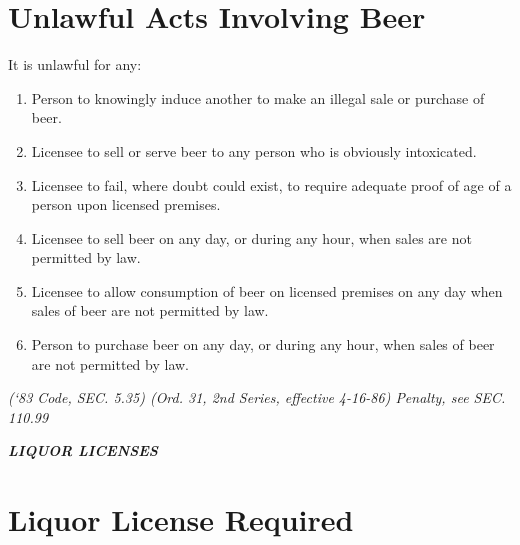 \section{Unlawful Acts Involving Beer}
It is unlawful for any:
\begin{enumerate}[{\indent}A)]
    \item Person to knowingly induce another to make an illegal sale or purchase of beer.
    \item Licensee to sell or serve beer to any person who is obviously intoxicated.
    \item Licensee to fail, where doubt could exist, to require adequate proof of age of a person upon licensed premises.
    \item Licensee to sell beer on any day, or during any hour, when sales are not permitted by law.
    \item Licensee to allow consumption of beer on licensed premises on any day when sales of beer are not permitted by law.
    \item Person to purchase beer on any day, or during any hour, when sales of beer are not permitted by law.
\end{enumerate}
\emph{(‘83 Code, SEC. 5.35)  (Ord. 31, 2nd Series, effective 4-16-86)  Penalty, see SEC. 110.99}

\begin{center}
    \emph{\textbf{\LARGE{LIQUOR LICENSES}}}
\end{center}

\setcounter{section}{79}
\section{Liquor License Required}
